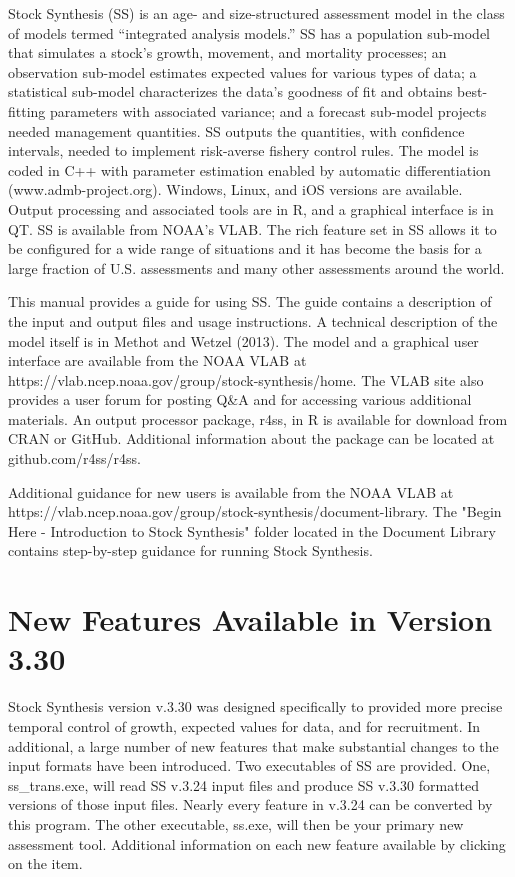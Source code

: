 Stock Synthesis (SS) is an age- and size-structured assessment model in the class of models termed “integrated analysis models.” SS has a population sub-model that simulates a stock’s growth, movement, and mortality processes; an observation sub-model estimates expected values for various types of data; a statistical sub-model characterizes the data’s goodness of fit and obtains best-fitting parameters with associated variance; and a forecast sub-model projects needed management quantities.  SS outputs the quantities, with confidence intervals, needed to implement risk-averse fishery control rules. The model is coded in C++ with parameter estimation enabled by automatic differentiation (www.admb-project.org).  Windows, Linux, and iOS versions are available.  Output processing and associated tools are in R, and a graphical interface is in QT.  SS is available from NOAA’s VLAB. The rich feature set in SS allows it to be configured for a wide range of situations and it has become the basis for a large fraction of U.S. assessments and many other assessments around the world.  

This manual provides a guide for using SS. The guide contains a description of the input and output files and usage instructions. A technical description of the model itself is in Methot and Wetzel (2013). The model and a graphical user interface are available from the NOAA VLAB at https://vlab.ncep.noaa.gov/group/stock-synthesis/home. The VLAB site also provides a user forum for posting Q\&A and for accessing various additional materials.  An output processor package, r4ss, in R is available for download from CRAN or GitHub. Additional information about the package can be located at github.com/r4ss/r4ss.

Additional guidance for new users is available from the NOAA VLAB at https://vlab.ncep.noaa.gov/group/stock-synthesis/document-library.  The "Begin Here - Introduction to Stock Synthesis" folder located in the Document Library contains step-by-step guidance for running Stock Synthesis.  
	
\section{New Features Available in Version 3.30}
Stock Synthesis version v.3.30 was designed specifically to provided more precise temporal control of growth, expected values for data, and for recruitment.  In additional, a large number of new features that make substantial changes to the input formats have been introduced.  Two executables of SS are provided.  One, ss\_trans.exe, will read SS v.3.24 input files and produce SS v.3.30 formatted versions of those input files.  Nearly every feature in v.3.24 can be converted by this program.  The other executable, ss.exe, will then be your primary new assessment tool. Additional information on each new feature available by clicking on the item.
		
